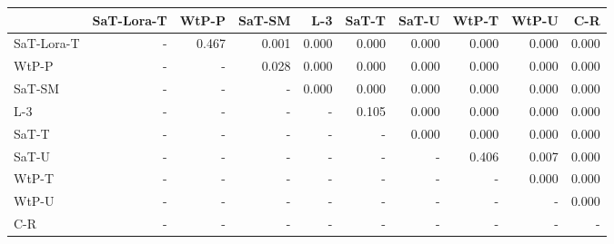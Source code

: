 \begin{tabular}{lrrrrrrrrr}
\toprule
 & SaT-Lora-T & WtP-P & SaT-SM & L-3 & SaT-T & SaT-U & WtP-T & WtP-U & C-R \\
\midrule
SaT-Lora-T & - & 0.467 & 0.001 & 0.000 & 0.000 & 0.000 & 0.000 & 0.000 & 0.000 \\
WtP-P & - & - & 0.028 & 0.000 & 0.000 & 0.000 & 0.000 & 0.000 & 0.000 \\
SaT-SM & - & - & - & 0.000 & 0.000 & 0.000 & 0.000 & 0.000 & 0.000 \\
L-3 & - & - & - & - & 0.105 & 0.000 & 0.000 & 0.000 & 0.000 \\
SaT-T & - & - & - & - & - & 0.000 & 0.000 & 0.000 & 0.000 \\
SaT-U & - & - & - & - & - & - & 0.406 & 0.007 & 0.000 \\
WtP-T & - & - & - & - & - & - & - & 0.000 & 0.000 \\
WtP-U & - & - & - & - & - & - & - & - & 0.000 \\
C-R & - & - & - & - & - & - & - & - & - \\
\bottomrule
\end{tabular}

